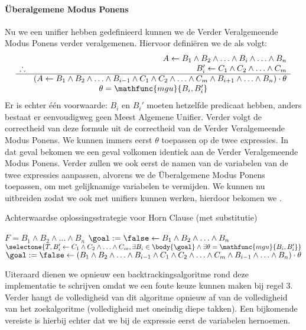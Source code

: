 \paragraph{\"Uberalgemene Modus Ponens}
Nu we een unifier hebben gedefinieerd kunnen we de Verder Veralgemeende Modus Ponens verder veralgemenen. Hiervoor defini\"eren we de  als volgt:
\begin{equation}
\begin{array}{lr}
&A\leftarrow B_1\wedge B_2\wedge\ldots\wedge B_i\wedge\ldots\wedge B_n\\
\therefore&B_i'\leftarrow C_1\wedge C_2\wedge\ldots\wedge C_m\\
\hline
&\left(A\leftarrow B_1\wedge B_2\wedge\ldots\wedge B_{i-1}\wedge C_1\wedge C_2\wedge\ldots\wedge C_m\wedge B_{i+1}\wedge\ldots\wedge B_n\right)\cdot\theta\\
\multicolumn{2}{c}{\theta=\mathfunc{mgu}{B_i,B_i'}}
\end{array}
\end{equation}
Er is echter \'e\'en voorwaarde: $B_i$ en $B_i'$ moeten hetzelfde predicaat hebben, anders bestaat er eenvoudigweg geen Meest Algemene Unifier. Verder volgt de correctheid van deze formule uit de correctheid van de Verder Veralgemeende Modus Ponens. We kunnen immers eerst $\theta$ toepassen op de twee expressies. In dat geval bekomen we een geval volkomen identiek aan de Verder Veralgemeende Modus Ponens. Verder zullen we ook eerst de namen van de variabelen van de twee expressies aanpassen, alvorens we de \"Uberalgemene Modus Ponens toepassen, om  met gelijknamige variabelen te vermijden. We kunnen nu  uitbreiden zodat we ook met unifiers kunnen werken, hierdoor bekomen we .
\begin{algorithm}[htb]
\caption{Achterwaardse oplossingsstrategie voor Horn Clause (met substitutie)}
\label{alg:backwardUberalgemeneModusPonens}
\begin{algorithmic}[1]
\REQUIRE $F=B_1\wedge B_2\wedge\ldots\wedge B_n$
\STATE $\goal:=\false\leftarrow B_1\wedge B_2\wedge\ldots\wedge B_n$
\REPEAT
\STATE$\selectone{T,B_i'\leftarrow C_1\wedge C_2\wedge\ldots\wedge C_m,\exists B_i\in\body{\goal}\wedge\exists\theta=\mathfunc{mgu}{B_i,B_i'}}$
\STATE$\goal:=\false\leftarrow\left(B_1\wedge B_2\wedge\ldots\wedge B_{i-1}\wedge C_1\wedge C_2\wedge\ldots\wedge C_m\wedge B_{i-1}\wedge\ldots\wedge B_n\right)\cdot\theta$
\end{algorithmic}
\end{algorithm}
Uiteraard dienen we opnieuw een backtrackingsalgoritme rond deze implementatie te schrijven omdat we een foute keuze kunnen maken bij regel 3. Verder hangt de volledigheid van dit algoritme opnieuw af van de volledigheid van het zoekalgoritme (volledigheid met oneindig diepe takken). Een bijkomende vereiste is hierbij echter dat we bij de expressie eerst de variabelen hernoemen.
